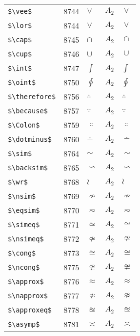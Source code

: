 \documentclass{article}
\begin{document}
\begin{table}
\begin{center}
\begin{tabular}{llll}
 \verb#$\vee$#            & 8744    & $\vee$            & $A_2\quad \vee$\\
 \verb#$\lor$#            & 8744    & $\lor$            & $A_2\quad \lor$\\
 \verb#$\cap$#            & 8745    & $\cap$            & $A_2\quad \cap$\\
 \verb#$\cup$#            & 8746    & $\cup$            & $A_2\quad \cup$\\
 \verb#$\int$#            & 8747    & $\int$            & $A_2\quad \int$\\
 \verb#$\oint$#           & 8750    & $\oint$           & $A_2\quad \oint$\\
 \verb#$\therefore$#      & 8756    & $\therefore$      & $A_2\quad \therefore$\\
 \verb#$\because$#        & 8757    & $\because$        & $A_2\quad \because$\\
 \verb#$\Colon$#          & 8759    & $\Colon$          & $A_2\quad \Colon$\\
 \verb#$\dotminus$#       & 8760    & $\dotminus$       & $A_2\quad \dotminus$\\
 \verb#$\sim$#            & 8764    & $\sim$            & $A_2\quad \sim$\\
 \verb#$\backsim$#        & 8765    & $\backsim$        & $A_2\quad \backsim$\\
 \verb#$\wr$#             & 8768    & $\wr$             & $A_2\quad \wr$\\
 \verb#$\nsim$#           & 8769    & $\nsim$           & $A_2\quad \nsim$\\
 \verb#$\eqsim$#          & 8770    & $\eqsim$          & $A_2\quad \eqsim$\\
 \verb#$\simeq$#          & 8771    & $\simeq$          & $A_2\quad \simeq$\\
 \verb#$\nsimeq$#         & 8772    & $\nsimeq$         & $A_2\quad \nsimeq$\\
 \verb#$\cong$#           & 8773    & $\cong$           & $A_2\quad \cong$\\
 \verb#$\ncong$#          & 8775    & $\ncong$          & $A_2\quad \ncong$\\
 \verb#$\approx$#         & 8776    & $\approx$         & $A_2\quad \approx$\\
 \verb#$\napprox$#        & 8777    & $\napprox$        & $A_2\quad \napprox$\\
 \verb#$\approxeq$#       & 8778    & $\approxeq$       & $A_2\quad \approxeq$\\
 \verb#$\asymp$#          & 8781    & $\asymp$          & $A_2\quad \asymp$\\

\end{tabular}
\end{center}
\end{table}
\end{document}
